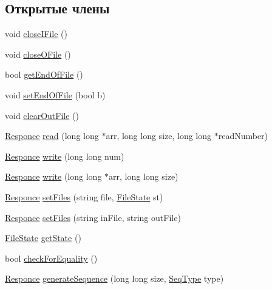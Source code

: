 \subsection*{Открытые члены}
\begin{DoxyCompactItemize}
\item 
void \hyperlink{class_file_manager_a4a4719a410ca31985e8b75ad75485ce6}{close\+I\+File} ()
\item 
void \hyperlink{class_file_manager_a6a1f1ddbf047fc7e9531f483e4c62148}{close\+O\+File} ()
\item 
bool \hyperlink{class_file_manager_a49df99509ff2700e0e5edd06adca345c}{get\+End\+Of\+File} ()
\item 
void \hyperlink{class_file_manager_ace8ce2677414831b5a9e7030248fc832}{set\+End\+Of\+File} (bool b)
\item 
void \hyperlink{class_file_manager_a2f1102abfd0a5a9d7e178968a3fdc56c}{clear\+Out\+File} ()
\item 
\hyperlink{_structures_8h_a9864d6ef28dd6e38416afac4426b3491}{Responce} \hyperlink{class_file_manager_aba031d681752c80f52a8a8af9b69834e}{read} (long long $\ast$arr, long long size, long long $\ast$read\+Number)
\item 
\hyperlink{_structures_8h_a9864d6ef28dd6e38416afac4426b3491}{Responce} \hyperlink{class_file_manager_a77cb9ec2885923dd6b7a9674cb75f85f}{write} (long long num)
\item 
\hyperlink{_structures_8h_a9864d6ef28dd6e38416afac4426b3491}{Responce} \hyperlink{class_file_manager_ad4c96727180b0055942d20b7b5bfe5f8}{write} (long long $\ast$arr, long long size)
\item 
\hyperlink{_structures_8h_a9864d6ef28dd6e38416afac4426b3491}{Responce} \hyperlink{class_file_manager_ab364b91193c482fc7387aec162f677ad}{set\+Files} (string file, \hyperlink{_structures_8h_a57306ae0f9e356347388234ed69e0ce7}{File\+State} st)
\item 
\hyperlink{_structures_8h_a9864d6ef28dd6e38416afac4426b3491}{Responce} \hyperlink{class_file_manager_a975bf0088fa67c83d78ec54b9f61a473}{set\+Files} (string in\+File, string out\+File)
\item 
\hyperlink{_structures_8h_a57306ae0f9e356347388234ed69e0ce7}{File\+State} \hyperlink{class_file_manager_abd4cbc2b218ab1828ae376a4a9137057}{get\+State} ()
\item 
bool \hyperlink{class_file_manager_ab490a5a5882d33781dcb6d1d42945d97}{check\+For\+Equality} ()
\item 
\hyperlink{_structures_8h_a9864d6ef28dd6e38416afac4426b3491}{Responce} \hyperlink{class_file_manager_a654c8bf606626cd419f5828839cb21a1}{generate\+Sequence} (long long size, \hyperlink{_structures_8h_a76639e910448c3333d0f4d204e53c2c1}{Seq\+Type} type)

\end{DoxyCompactItemize}
